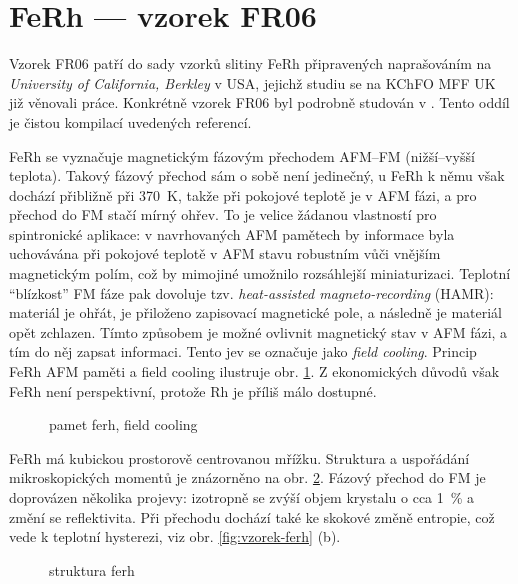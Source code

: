 \section{FeRh --- vzorek FR06}
\label{chap:vzorek-ferh}

Vzorek FR06 patří do sady vzorků slitiny FeRh připravených naprašováním na \emph{University of California, Berkley} v USA, jejichž studiu se na KChFO MFF UK již věnovali práce.
Konkrétně vzorek FR06 byl podrobně studován v .
Tento oddíl je čistou kompilací uvedených referencí.

FeRh se vyznačuje magnetickým fázovým přechodem AFM--FM \tododash (nižší--vyšší teplota).
Takový fázový přechod sám o sobě není jedinečný, u FeRh k němu však dochází přibližně při \SI{370}{\kelvin}, takže při pokojové teplotě je v AFM fázi, a pro přechod do FM stačí mírný ohřev.
To je velice žádanou vlastností pro spintronické aplikace: v navrhovaných AFM pamětech by informace byla uchovávána při pokojové teplotě v AFM stavu robustním vůči vnějším magnetickým polím, což by mimojiné umožnilo rozsáhlejší miniaturizaci.
Teplotní ``blízkost'' FM fáze pak dovoluje tzv. \emph{heat-assisted magneto-recording} (HAMR): materiál je ohřát, je přiloženo zapisovací magnetické pole, a následně je materiál opět zchlazen.
Tímto způsobem je možné ovlivnit magnetický stav v AFM fázi, a tím do něj zapsat informaci.
Tento jev se označuje jako \emph{field cooling}.
Princip FeRh AFM paměti a field cooling ilustruje obr. \ref{fig:ferh-memory}.
Z ekonomických důvodů však FeRh není perspektivní, protože Rh je příliš málo dostupné.

\begin{figure}[htbp]
    \centering
    \caption{pamet ferh, field cooling}
    \label{fig:ferh-memory}
\end{figure}

FeRh má kubickou prostorově centrovanou mřížku.
Struktura a uspořádání mikroskopických momentů je znázorněno na obr. \ref{fig:ferh-struktura}.
Fázový přechod do FM je doprovázen několika projevy: izotropně se zvýší objem krystalu o cca \SI{1}{\percent} a změní se reflektivita.
Při přechodu dochází také ke skokové změně entropie, což vede k teplotní hysterezi, viz obr. \ref{fig:vzorek-ferh} (b).

\begin{figure}[htbp]
    \centering
    \caption{struktura ferh}
    \label{fig:ferh-struktura}
\end{figure}

